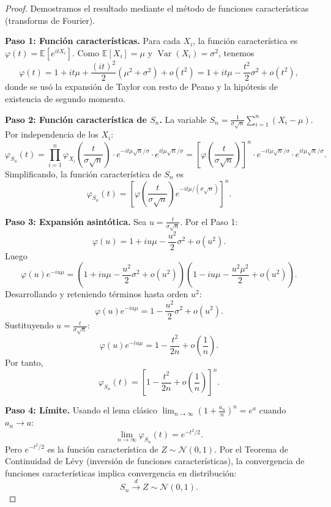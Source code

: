 \documentclass[11pt,a4paper]{article}
\theoremstyle{plain}
\theoremstyle{definition}
\begin{document}
\begin{proof}
Demostramos el resultado mediante el método de funciones características (transforms de Fourier).

\textbf{Paso 1: Función características.} Para cada $X_{i}$, la función característica es $\varphi(t)=\mathbb{E}[e^{itX_{i}}]$. Como $\mathbb{E}[X_{i}]=\mu$ y $\operatorname{Var}(X_{i})=\sigma^{2}$, tenemos
\[
\varphi(t)=1+it\mu+\frac{(it)^{2}}{2}(\mu^{2}+\sigma^{2})+o(t^{2})=1+it\mu-\frac{t^{2}}{2}\sigma^{2}+o(t^{2}),
\]
donde se usó la expansión de Taylor con resto de Peano y la hipótesis de existencia de segundo momento.

\textbf{Paso 2: Función característica de $S_{n}$.} La variable $S_{n}=\frac{1}{\sigma\sqrt{n}}\sum_{i=1}^{n}(X_{i}-\mu)$. Por independencia de los $X_{i}$:
\[
\varphi_{S_{n}}(t)=\prod_{i=1}^{n}\varphi_{X_{i}}\!\left(\frac{t}{\sigma\sqrt{n}}\right)\cdot e^{-it\mu\sqrt{n}/\sigma}\cdot e^{it\mu\sqrt{n}/\sigma}=\left[\varphi\!\left(\frac{t}{\sigma\sqrt{n}}\right)\right]^{n}\cdot e^{-it\mu\sqrt{n}/\sigma}\cdot e^{it\mu\sqrt{n}/\sigma}.
\]
Simplificando, la función característica de $S_{n}$ es
\[
\varphi_{S_{n}}(t)=\left[\varphi\!\left(\frac{t}{\sigma\sqrt{n}}\right)e^{-it\mu/(\sigma\sqrt{n})}\right]^{n}.
\]

\textbf{Paso 3: Expansión asintótica.} Sea $u=\frac{t}{\sigma\sqrt{n}}$. Por el Paso 1:
\[
\varphi(u)=1+iu\mu-\frac{u^{2}}{2}\sigma^{2}+o(u^{2}).
\]
Luego
\[
\varphi(u)e^{-iu\mu}=\left(1+iu\mu-\frac{u^{2}}{2}\sigma^{2}+o(u^{2})\right)\left(1-iu\mu-\frac{u^{2}\mu^{2}}{2}+o(u^{2})\right).
\]
Desarrollando y reteniendo términos hasta orden $u^{2}$:
\[
\varphi(u)e^{-iu\mu}=1-\frac{u^{2}}{2}\sigma^{2}+o(u^{2}).
\]
Sustituyendo $u=\frac{t}{\sigma\sqrt{n}}$:
\[
\varphi(u)e^{-iu\mu}=1-\frac{t^{2}}{2n}+o\!\left(\frac{1}{n}\right).
\]
Por tanto,
\[
\varphi_{S_{n}}(t)=\left[1-\frac{t^{2}}{2n}+o\!\left(\frac{1}{n}\right)\right]^{n}.
\]

\textbf{Paso 4: Límite.} Usando el lema clásico $\lim_{n\to\infty}\left(1+\frac{a_{n}}{n}\right)^{n}=e^{a}$ cuando $a_{n}\to a$:
\[
\lim_{n\to\infty}\varphi_{S_{n}}(t)=e^{-t^{2}/2}.
\]
Pero $e^{-t^{2}/2}$ es la función característica de $Z\sim\mathcal{N}(0,1)$. Por el Teorema de Continuidad de Lévy (inversión de funciones características), la convergencia de funciones características implica convergencia en distribución:
\[
S_{n}\xrightarrow{d}Z\sim\mathcal{N}(0,1).
\]
\end{proof}

\end{document}
